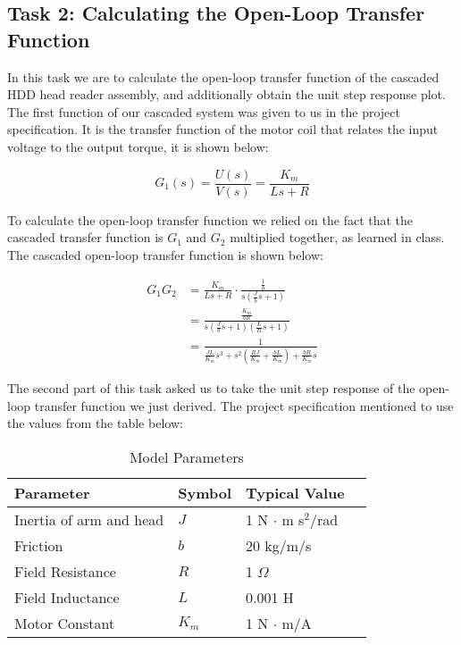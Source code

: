 \documentclass{article}
\begin{document}
\subsection*{Task 2: Calculating the Open-Loop Transfer Function}

In this task we are to calculate the open-loop transfer function of
the cascaded HDD head reader assembly, and additionally obtain the
unit step response plot. The first function of our cascaded system was
given to us in the project specification. It is the transfer function
of the motor coil that relates the input voltage to the output torque,
it is shown below:

$$G_1(s) = \frac{U(s)}{V(s)} = \frac{K_m}{Ls + R}$$

To calculate the open-loop transfer function we relied on the fact
that the cascaded transfer function is $G_1$ and $G_2$ multiplied
together, as learned in class. The cascaded open-loop transfer
function is shown below:

\begin{align*}
  G_1G_2 &= \frac{K_m}{Ls+R} \cdot \frac{\frac{1}{b}}{s(\frac{J}{b}s + 1)} \\
         &= \frac{\frac{K_m}{bR}}{s\left(\frac{J}{b}s + 1\right)  
		 \left(\frac{L}{R}s + 1\right)} \\
         &= \frac{1}{\frac{JL}{K_m}s^3 + s^2\left( \frac{RJ}{K_m} + 
		 \frac{bL}{K_m} \right) + \frac{bR}{K_m}s}
\end{align*}

The second part of this task asked us to take the unit step response
of the open-loop transfer function we just derived. The project
specification mentioned to use the values from the table below:

\begin{table}[H]
  \begin{center}
    \begin{tabular}{ | l | l | l | p{5cm} |}
    \hline
    \textbf{Parameter} & \textbf{Symbol} & \textbf{Typical Value} \\ \hline
    Inertia of arm and head & $J$ & 1 N $\cdot$ m s$^2$/rad \\ \hline 
    Friction & $b$ & 20 kg/m/s \\ \hline
    Field Resistance & $R$ & 1 $\Omega$ \\ \hline
    Field Inductance & $L$ & 0.001 H \\ \hline
    Motor Constant & $K_m$ & 1 N $\cdot$ m/A \\ \hline
   \end{tabular}
 \end{center}
 \caption{Model Parameters}
\end{table}
\end{document}
